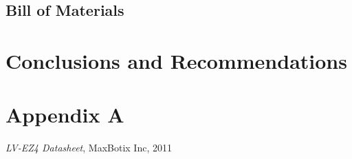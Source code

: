 \documentclass[oneside,final]{report}
\begin{document}
\section{Bill of Materials}


\chapter{Conclusions and Recommendations}

\chapter*{Appendix A}

\begin{thebibliography}{9}


   \emph{LV-EZ4 Datasheet}, MaxBotix Inc, 2011

\end{thebibliography}
\end{document}
